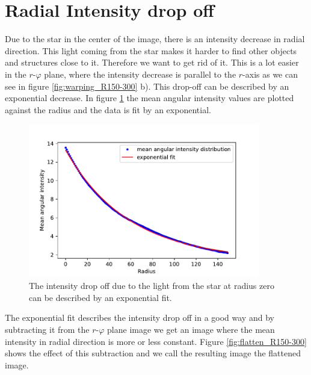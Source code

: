 \section{Radial Intensity drop off}
\label{sec:radial_intensity}
Due to the star in the center of the image, there is an intensity decrease in radial direction. This light coming from the star makes it harder to find other objects and structures close to it. Therefore we want to get rid of it. This is a lot easier in the $r$-$\varphi$ plane, where the intensity decrease is parallel to the $r$-axis as we can see in figure \ref{fig:warping_R150-300} b). This drop-off can be described by an exponential decrease. In figure \ref{fig:mean_angular_intensity_R150_300} the mean angular intensity values are plotted against the radius and the data is fit by an exponential.
\begin{figure}[H]
	\centering
		\includegraphics[width=0.9\textwidth]{pics/mean_angular_intensity_R150_300.pdf}
\caption{The intensity drop off due to the light from the star at radius zero can be described by an exponential fit.}
\label{fig:mean_angular_intensity_R150_300}
\end{figure}
The exponential fit describes the intensity drop off in a good way and by subtracting it from the $r$-$\varphi$ plane image we get an image where the mean intensity in radial direction is more or less constant. Figure \ref{fig:flatten_R150-300} shows the effect of this subtraction and we call the resulting image the flattened image.  
